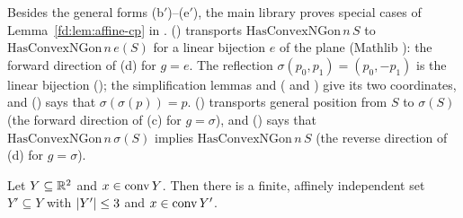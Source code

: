 \begin{remark}\label{fd:rem:affine-cp-lean}\sloppy
Besides the general forms (b$'$)--(e$'$), the main library proves special cases of
Lemma~\ref{fd:lem:affine-cp} in .
 () transports
$\mathrm{HasConvexNGon}\,n\,S$ to $\mathrm{HasConvexNGon}\,n\,e(S)$ for a linear bijection $e$ of the
plane (Mathlib ): the forward direction of (d) for $g=e$. The reflection
$\sigma(p_0,p_1)=(p_0,-p_1)$ is the linear bijection 
(); the simplification lemmas  and
 ( and ) give its two
coordinates, and  () says that
$\sigma(\sigma(p))=p$. 
() transports general position from $S$ to $\sigma(S)$ (the
forward direction of (c) for $g=\sigma$), and 
() says that $\mathrm{HasConvexNGon}\,n\,\sigma(S)$ implies
$\mathrm{HasConvexNGon}\,n\,S$ (the reverse direction of (d) for $g=\sigma$).
\end{remark}

\begin{lemma}\label{fd:lem:caratheodory}
Let $Y\subseteq\mathbb R^2$ and $x\in\operatorname{conv} Y$. Then there is a finite, affinely independent set $Y'\subseteq Y$
with $\lvert Y'\rvert\le3$ and $x\in\operatorname{conv} Y'$.
\end{lemma}

